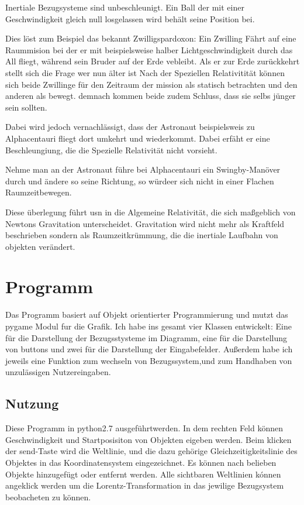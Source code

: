 \documentclass[12pt]{article}
\begin{document}
Inertiale Bezugsysteme sind unbeschleunigt.
Ein Ball der mit einer Geschwindigkeit gleich null losgelassen wird behält seine Position bei.

Dies löst zum Beispiel das bekannt Zwilligspardoxon:
Ein Zwilling Fährt auf eine Raummision bei der er mit beispielsweise halber Lichtgeschwindigkeit durch das All fliegt, während sein Bruder auf der Erde vebleibt.
Als er zur Erde zurückkehrt stellt sich die Frage wer nun älter ist
Nach der Speziellen Relativitität können sich beide Zwillinge für den Zeitraum der mission als statisch betrachten und den anderen als bewegt.
demnach kommen beide zudem Schluss, dass sie selbs jünger sein sollten.

Dabei wird jedoch vernachlässigt, dass der Astronaut beispielsweis zu Alphacentauri fliegt dort umkehrt und wiederkommt.
Dabei erfäht er eine Beschleungiung, die die Spezielle Relativität nicht vorsieht.

Nehme man an der Astronaut führe bei Alphacentauri ein Swingby-Manöver durch und ändere so seine Richtung, so würdeer sich nicht in einer Flachen Raumzeitbewegen.

Diese überlegung führt usn in die Algemeine Relativität, die sich maßgeblich von Newtons Gravitation unterscheidet.
Gravitation wird nicht mehr als Kraftfeld beschrieben sondern als Raumzeitkrümmung, die die inertiale Laufbahn von objekten verändert.

\section{Programm}
Das Programm basiert auf Objekt orientierter Programmierung und mutzt das pygame Modul fur die Grafik.
Ich habe ins gesamt vier Klassen entwickelt:
Eine für die Darstellung der Bezugsstysteme im Diagramm, eine für die Darstellung von buttons und zwei für die Darstellung der Eingabefelder.
Außerdem habe ich jeweils eine Funktion zum wechseln von Bezugssystem,und zum Handhaben von unzulässigen Nutzereingaben.
\subsection{Nutzung}
Diese Programm in python2.7 ausgeführtwerden.
In dem rechten Feld können Geschwindigkeit und Startposisiton von Objekten eigeben werden.
Beim klicken der send-Taste wird die Weltlinie, und die dazu gehörige Gleichzeitigkeitslinie des Objektes in das Koordinatensystem eingezeichnet.
Es können nach belieben Objekte hinzugefügt oder entfernt werden.
Alle sichtbaren Weltlinien kónnen angeklick werden um die Lorentz-Transformation in das jewilige Bezugsystem beobacheten zu können.
\end{document}
